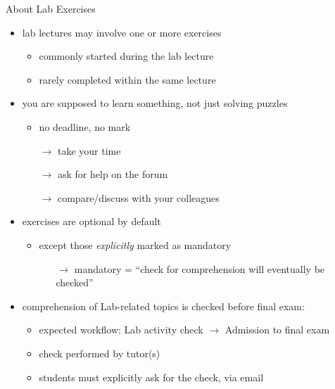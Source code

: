 \documentclass[presentation]{beamer}\mode<presentation>{\usetheme{AMSBolognaFC}}
\begin{document}
\begin{frame}[c,allowframebreaks]{About Lab Exercises}

    \begin{itemize}

        \item lab lectures may involve one or more exercises
        \begin{itemize}
            \item commonly started during the lab lecture
            \item rarely completed within the same lecture
        \end{itemize}

        \bigskip

        \item you are supposed to learn something, not just solving puzzles
        \begin{itemize}
            \item no deadline, no mark
            \item[$\rightarrow$] take your time
            \item[$\rightarrow$] ask for help on the forum
            \item[$\rightarrow$] compare/discuss with your colleagues
        \end{itemize}

        \bigskip

        \item exercises are \alert{optional by default}
        \begin{itemize}
            \item except those \emph{explicitly} marked as \alert{mandatory}
            \begin{itemize}
                \item[$\rightarrow$] mandatory = ``check for comprehension will eventually be checked''
            \end{itemize}
        \end{itemize}

        \framebreak

        \item comprehension of Lab-related topics is checked before final exam:
        \begin{itemize}
            \item \alert{expected workflow:} Lab activity check $\rightarrow$ Admission to final exam
            \item check performed by tutor(s)
            \item students must explicitly ask for the check, via email
        \end{itemize}


\end{itemize}
\end{frame}
\end{document}
